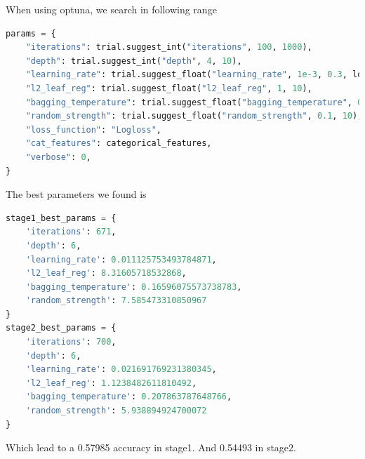 \par When using optuna, we search in following range
\begin{lstlisting}[language=Python]
params = {
    "iterations": trial.suggest_int("iterations", 100, 1000),
    "depth": trial.suggest_int("depth", 4, 10),
    "learning_rate": trial.suggest_float("learning_rate", 1e-3, 0.3, log=True),
    "l2_leaf_reg": trial.suggest_float("l2_leaf_reg", 1, 10),
    "bagging_temperature": trial.suggest_float("bagging_temperature", 0, 1),
    "random_strength": trial.suggest_float("random_strength", 0.1, 10),
    "loss_function": "Logloss",
    "cat_features": categorical_features,
    "verbose": 0,
}
\end{lstlisting}
The best parameters we found is
\begin{lstlisting}[language=Python]
stage1_best_params = {
    'iterations': 671, 
    'depth': 6, 
    'learning_rate': 0.011125753493784871, 
    'l2_leaf_reg': 8.31605718532868, 
    'bagging_temperature': 0.16596075573738783, 
    'random_strength': 7.585473310850967
}
stage2_best_params = {
    'iterations': 700,
    'depth': 6, 
    'learning_rate': 0.021691769231380345, 
    'l2_leaf_reg': 1.1238482611810492, 
    'bagging_temperature': 0.207863787648766, 
    'random_strength': 5.938894924700072
}
\end{lstlisting}
Which lead to a 0.57985 accuracy in stage1. And 0.54493 in stage2.